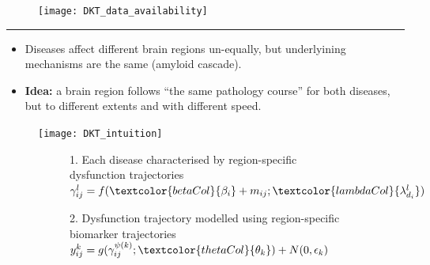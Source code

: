 \documentclass[portrait,a0,final,20pt]{a0poster}
\newcommand{\fnt}[1]{\LARGE{#1}}
\begin{document}
{\begin{multicols}{2}
\begin{figure}[H]
 \centering
 \texttt{[image: DKT\_data\_availability]}
\end{figure}


\end{multicols}
\hrule
\vspace{0.2em}



\begin{multicols}{2}							
\raggedcolumns	


\begin{itemize}
 \item Diseases affect different brain regions un-equally, but underlyining mechanisms are the same (amyloid cascade).
 \item \textbf{Idea:} a brain region follows ``the same pathology course'' for both diseases, but to different extents and with different speed.
\end{itemize}

\begin{figure}[H]
\centering
\texttt{[image: DKT\_intuition]}
 
\end{figure}


 
\vspace{0.6em}
\begin{figure}[H]
 \centering
   \begin{subfigure}{0.49\columnwidth}
   \centering
   \fnt{1. Each disease characterised by region-specific \textcolor{lambdaCol}{dysfunction trajectories}}\\
   $ \gamma_{ij}^l = f(\textcolor{betaCol}{\beta_{i}} + m_{ij}; \textcolor{lambdaCol}{\lambda_{d_i}^l}) $\\
   
  \end{subfigure}
  \begin{subfigure}{0.49\columnwidth}
   \centering
   \fnt{2. Dysfunction trajectory modelled using region-specific \textcolor{thetaCol}{biomarker trajectories}}\\
   $ y_{ij}^k = g( \gamma_{ij}^{\psi(k)} ; \textcolor{thetaCol}{\theta_k}) + N(0,\epsilon_k) $\\
   

\end{subfigure}
\end{figure}
\end{multicols}}
\end{document}
